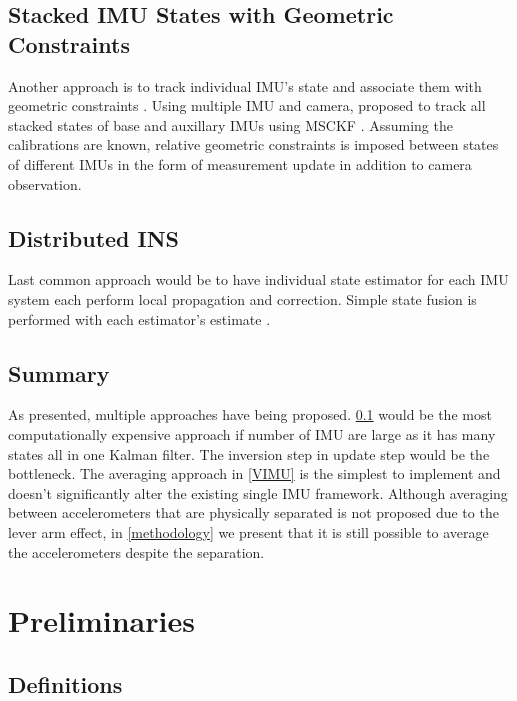 \documentclass[conference]{IEEEtran}
\begin{document}
\subsection{Stacked IMU States with Geometric Constraints}\label{constraint}

Another approach is to track individual IMU's state and associate them with geometric constraints \cite{waegli2008, Beaudoin2018_satelite}. Using multiple IMU and camera, \cite{Eckenhoff2021_MIMC-VINS} proposed to track all stacked states of base and auxillary IMUs using MSCKF \cite{Anastasios2007_MSCKF}. Assuming the calibrations are known, relative geometric constraints is imposed between states of different IMUs in the form of measurement update in addition to camera observation.

\subsection{Distributed INS}\label{distributed}

Last common approach would be to have individual state estimator for each IMU system each perform local propagation and correction. Simple state fusion is performed with each estimator's estimate \cite{Bancroft2011DataFA, patel2022_multi-imu}.

\subsection{Summary}

As presented, multiple approaches have being proposed. \ref{constraint} would be the most computationally expensive approach if number of IMU are large as it has many states all in one Kalman filter. The inversion step in update step would be the bottleneck. The averaging approach in \ref{VIMU} is the simplest to implement and doesn't significantly alter the existing single IMU framework. Although averaging between accelerometers that are physically separated is not proposed due to the lever arm effect, in \ref{methodology} we present that it is still possible to average the accelerometers despite the separation.

\section{Preliminaries}

\subsection{Definitions}
\end{document}
